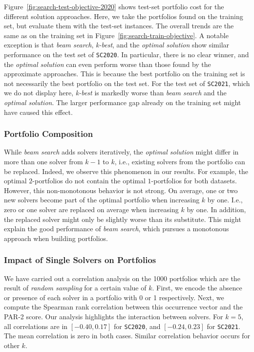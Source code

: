 \documentclass[conference]{IEEEtran}
\begin{document}
Figure~\ref{fig:search-test-objective-2020} shows test-set portfolio cost for the different solution approaches.
Here, we take the portfolios found on the training set, but evaluate them with the test-set instances.
The overall trends are the same as on the training set in Figure~\ref{fig:search-train-objective}.
A notable exception is that \emph{beam search}, \emph{k-best}, and the \emph{optimal solution} show similar performance on the test set of \texttt{SC2020}.
In particular, there is no clear winner, and the \emph{optimal solution} can even perform worse than those found by the approximate approaches. 
This is because the best portfolio on the training set is not necessarily the best portfolio on the test set.
For the test set of \texttt{SC2021}, which we do not display here, \emph{k-best} is markedly worse than \emph{beam search} and the \emph{optimal solution}. 
The larger performance gap already on the training set might have caused this effect.

\subsubsection{Portfolio Composition}

While \emph{beam search} adds solvers iteratively, the \emph{optimal solution} might differ in more than one solver from $k-1$ to $k$, i.e., existing solvers from the portfolio can be replaced.
Indeed, we observe this phenomenon in our results.
For example, the optimal $2$-portfolios do not contain the optimal $1$-portfolios for both datasets.
However, this non-monotonous behavior is not strong.
On average, one or two new solvers become part of the optimal portfolio when increasing $k$ by one.
I.e., zero or one solver are replaced on average when increasing $k$ by one.
In addition, the replaced solver might only be slightly worse than its substitute.
This might explain the good performance of \emph{beam search}, which pursues a monotonous approach when building portfolios.

\subsubsection{Impact of Single Solvers on Portfolios}

We have carried out a correlation analysis on the 1000 portfolios which are the result of \emph{random sampling} for a certain value of $k$. 
First, we encode the absence or presence of each solver in a portfolio with 0 or 1 respectively.
Next, we compute the Spearman rank correlation between this occurrence vector and the PAR-2 score.
Our analysis highlights the interaction between solvers. 
For $k=5$, all correlations are in $[-0.40,0.17]$ for \texttt{SC2020}, and $[-0.24,0.23]$ for \texttt{SC2021}.
The mean correlation is zero in both cases.
Similar correlation behavior occurs for other $k$.
\end{document}
